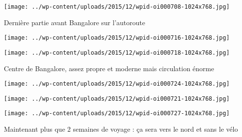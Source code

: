 \centerline{\texttt{[image: ../wp-content/uploads/2015/12/wpid-oi000708-1024x768.jpg]} } 
 \newline
 Dernière partie avant Bangalore sur l'autoroute \newline
 \newline
\centerline{\texttt{[image: ../wp-content/uploads/2015/12/wpid-oi000716-1024x768.jpg]} } 
 \newline
 \newline
\centerline{\texttt{[image: ../wp-content/uploads/2015/12/wpid-oi000718-1024x768.jpg]} } 
 \newline
 Centre de Bangalore, assez propre et moderne mais circulation énorme \newline
 \newline
\centerline{\texttt{[image: ../wp-content/uploads/2015/12/wpid-oi000724-1024x768.jpg]} } 
 \newline
 \newline
\centerline{\texttt{[image: ../wp-content/uploads/2015/12/wpid-oi000721-1024x768.jpg]} } 
 \newline
 \newline
\centerline{\texttt{[image: ../wp-content/uploads/2015/12/wpid-oi000727-1024x768.jpg]} } 
 \newline
 Maintenant plus que 2 semaines de voyage : ça sera vers le nord et sans le vélo \newline

\newpage
 
